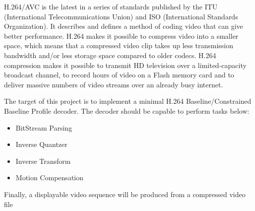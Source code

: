 \documentclass[../main.tex]{subfiles}
\begin{document}
H.264/AVC is the latest in a series of standards published by the ITU (International Telecommunications Union) and ISO (International Standards Organization). It describes and defines a method of coding video that can give better performance. H.264 makes it possible to compress video into a smaller space, which means that a compressed video clip takes up less transmission bandwidth and/or less storage space compared to older codecs. H.264 compression makes it possible to transmit HD television over a limited-capacity broadcast channel, to record hours of video on a Flash memory card and to deliver massive numbers of video streams over an already busy internet.

The target of this project is to implement a minimal H.264 Baseline/Constrained Baseline Profile decoder. The decoder should be capable to perform tasks below:

\begin{itemize}
\item BitStream Parsing 
\item Inverse Quantzer 
\item Inverse Transform 
\item Motion Compensation 
\end{itemize}

Finally, a displayable video sequence will be produced from a compressed video file
\end{document}
